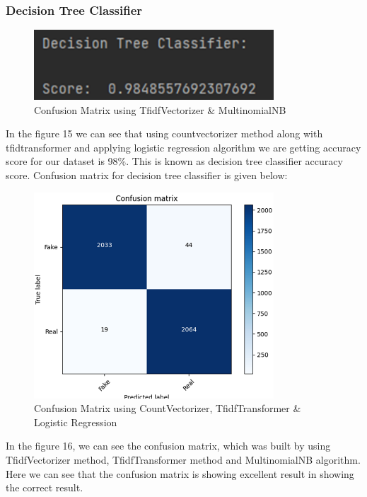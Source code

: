 \documentclass{article}
\begin{document}
\subsubsection{Decision Tree Classifier}
     \begin{figure}[!h]
    \centering
    \includegraphics[width=0.8\textwidth]{image15.png}
    \caption{Confusion Matrix using TfidfVectorizer \& MultinomialNB}
    \label{fig:label}
    \end{figure}\break
    In the figure 15 we can see that using countvectorizer method along with tfidtransformer and applying logistic regression algorithm we are getting accuracy score for our dataset is 98\%. This is known as decision tree classifier accuracy score. Confusion matrix for decision tree classifier is given below: 
    \break
    \begin{figure}[!h]
    \centering
    \includegraphics[width=0.8\textwidth]{image16.png}
    \caption{Confusion Matrix using CountVectorizer, TfidfTransformer \& Logistic Regression}
    \label{fig:label}
    \end{figure}\break
    In the figure 16, we can see the confusion matrix, which was built by using TfidfVectorizer method, TfidfTransformer method and MultinomialNB algorithm. Here we can see that the confusion matrix is showing excellent result in showing the correct result.
    
\end{document}
